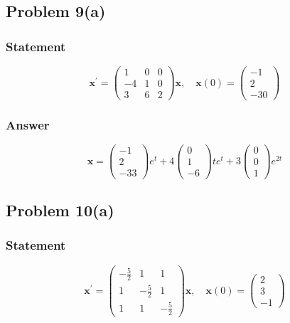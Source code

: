 \documentclass[12pt]{article}
\begin{document}
\subsection*{Problem 9(a)}
\label{sec:org2212a7d}
\subsubsection*{Statement}
\label{sec:org08252c5}
    \begin{equation*}
\mathbf{x}^{\prime}=\left(\begin{array}{rrr}
1 & 0 & 0 \\
-4 & 1 & 0 \\
3 & 6 & 2
\end{array}\right) \mathbf{x}, \quad \mathbf{x}(0)=\left(\begin{array}{r}
-1 \\
2 \\
-30
\end{array}\right)
\end{equation*}
\subsubsection*{Answer}
\label{sec:org52c5962}
    \begin{equation*}
\mathbf{x}=\left(\begin{array}{r}
-1 \\
2 \\
-33
\end{array}\right) e^{t}+4\left(\begin{array}{r}
0 \\
1 \\
-6
\end{array}\right) t e^{t}+3\left(\begin{array}{l}
0 \\
0 \\
1
\end{array}\right) e^{2 t}
\end{equation*}
\subsection*{Problem 10(a)}
\label{sec:orgb35580f}
\subsubsection*{Statement}
\label{sec:org879ca54}
    \begin{equation*}
\mathbf{x}^{\prime}=\left(\begin{array}{rrr}
-\frac{5}{2} & 1 & 1 \\
1 & -\frac{5}{2} & 1 \\
1 & 1 & -\frac{5}{2}
\end{array}\right) \mathbf{x}, \quad \mathbf{x}(0)=\left(\begin{array}{r}
2 \\
3 \\
-1
\end{array}\right)
\end{equation*}
\end{document}
